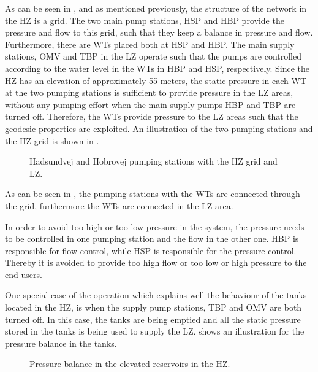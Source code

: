 As can be seen in , and as mentioned previously, the structure of the network in the HZ is a grid. The two main pump stations, HSP and HBP provide the pressure and flow to this grid, such that they keep a balance in pressure and flow. Furthermore, there are WTs placed both at HSP and HBP. The main supply stations, OMV and TBP in the LZ operate such that the pumps are controlled according to the water level in the WTs in HBP and HSP, respectively. Since the HZ has an elevation of approximately 55 meters, the static pressure in each WT at the two pumping stations is sufficient to provide pressure in the LZ areas, without any pumping effort when the main supply pumps HBP and TBP are turned off. Therefore, the WTs provide pressure to the LZ areas such that the geodesic properties are exploited. An illustration of the two pumping stations and the HZ grid is shown in . 

\begin{figure}[H]
\centering

\caption{Hadsundvej and Hobrovej pumping stations with the HZ grid and LZ.}
\label{fig:HBP_HSP_grid}
\end{figure}

\vspace{-3mm}

As can be seen in , the pumping stations with the WTs are connected through the grid, furthermore the WTs are connected in the LZ area.

In order to avoid too high or too low pressure in the system, the pressure needs to be controlled in one pumping station and the flow in the other one. HBP is responsible for flow control, while HSP is responsible for the pressure control. Thereby it is avoided to provide too high flow or too low or high pressure to the end-users. 

One special case of the operation which explains well the behaviour of the tanks located in the HZ, is when the supply pump stations, TBP and OMV are both turned off. In this case, the tanks are being emptied and all the static pressure stored in the tanks is being used to supply the LZ.  shows an illustration for the pressure balance in the tanks.

\begin{figure}[H]
\centering

\caption{Pressure balance in the elevated reservoirs in the HZ. }
\label{fig:pressure_balance_Randers}
\end{figure}

